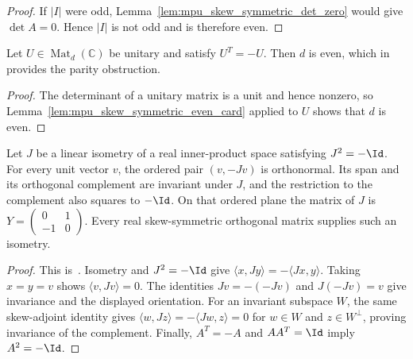 \begin{proof}\leanok
    If $|I|$ were odd, Lemma~\ref{lem:mpu_skew_symmetric_det_zero} would give
    $\det A=0$. Hence $|I|$ is not odd and is therefore even.
\end{proof}

\begin{lemma}
    \label{thm:mpu_skew_unitary_even_dimension}
    \leanok
    Let $U\in\operatorname{Mat}_d(\mathbb C)$ be unitary and satisfy
    $U^T=-U$. Then $d$ is even, which in \cite[Proposition~V.2, Case~II]{Cirac2017MPU} provides the parity
    obstruction.
\end{lemma}

\begin{proof}\leanok
    The determinant of a unitary matrix is a unit and hence nonzero, so
    Lemma~\ref{lem:mpu_skew_symmetric_even_card} applied to $U$ shows that $d$ is even.
\end{proof}

\begin{lemma}
    \label{lem:mpu_skew_orthogonal_plane}
    \leanok
    Let $J$ be a linear isometry of a real inner-product space satisfying
    $J^2=-\Id$. For every unit vector $v$, the ordered pair $(v,-Jv)$ is
    orthonormal. Its span and its orthogonal complement are invariant under
    $J$, and the restriction to the complement also squares to $-\Id$.
    On that ordered plane the matrix of $J$ is
    $Y=\left(\begin{smallmatrix}0&1\\-1&0\end{smallmatrix}\right)$.
    Every real skew-symmetric orthogonal matrix supplies such an isometry.
\end{lemma}
\begin{proof}\leanok
    This is~\cite[``Invariant orthogonal planes'']{QICLean2026Blueprint}.
    Isometry and $J^2=-\Id$ give
    $\langle x,Jy\rangle=-\langle Jx,y\rangle$. Taking $x=y=v$ shows
    $\langle v,Jv\rangle=0$. The identities $Jv=-(-Jv)$ and
    $J(-Jv)=v$ give invariance and the displayed orientation. For an invariant
    subspace $W$, the same skew-adjoint identity gives
    $\langle w,Jz\rangle=-\langle Jw,z\rangle=0$ for $w\in W$ and
    $z\in W^\perp$, proving invariance of the complement. Finally,
    $A^T=-A$ and $AA^T=\Id$ imply $A^2=-\Id$.
\end{proof}

